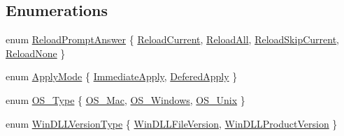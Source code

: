 \subsection*{Enumerations}
\begin{DoxyCompactItemize}
\item 
enum \hyperlink{namespace_utils_a4b02d8e41b34d9ba5605aa6235965efb}{Reload\-Prompt\-Answer} \{ \hyperlink{namespace_utils_a4b02d8e41b34d9ba5605aa6235965efbae44d99051cbed57052984300a3c0a33c}{Reload\-Current}, 
\hyperlink{namespace_utils_a4b02d8e41b34d9ba5605aa6235965efbadae5612b6d3984b62c344e46869a6c27}{Reload\-All}, 
\hyperlink{namespace_utils_a4b02d8e41b34d9ba5605aa6235965efbaa52c359f0451a96e276fa98bef31a7b7}{Reload\-Skip\-Current}, 
\hyperlink{namespace_utils_a4b02d8e41b34d9ba5605aa6235965efba415c3130cb3736c073d02b7e18e4c266}{Reload\-None}
 \}
\item 
enum \hyperlink{namespace_utils_ac2d001247aaff664db3acdb312344458}{Apply\-Mode} \{ \hyperlink{namespace_utils_ac2d001247aaff664db3acdb312344458af3f1f77aef1aabcbd3f037dc744ce210}{Immediate\-Apply}, 
\hyperlink{namespace_utils_ac2d001247aaff664db3acdb312344458a6081d5dba39502dab03be7d2eb297166}{Defered\-Apply}
 \}
\item 
enum \hyperlink{namespace_utils_abe7fc5d4caae893f6d9048a9e5398cd9}{O\-S\-\_\-\-Type} \{ \hyperlink{namespace_utils_abe7fc5d4caae893f6d9048a9e5398cd9acdc4c58a2d65ac2e1921908e1ce7ce18}{O\-S\-\_\-\-Mac}, 
\hyperlink{namespace_utils_abe7fc5d4caae893f6d9048a9e5398cd9a272f059e9ce6c37f8d610b9205a8f36a}{O\-S\-\_\-\-Windows}, 
\hyperlink{namespace_utils_abe7fc5d4caae893f6d9048a9e5398cd9a409fa5aa65dc870bb225847537172a57}{O\-S\-\_\-\-Unix}
 \}
\item 
enum \hyperlink{namespace_utils_a8a09ecaa3bd4054c9ec43e90ec1a355e}{Win\-D\-L\-L\-Version\-Type} \{ \hyperlink{namespace_utils_a8a09ecaa3bd4054c9ec43e90ec1a355eaf8a1858cecec3b9a5a936eedcb5a1e8a}{Win\-D\-L\-L\-File\-Version}, 
\hyperlink{namespace_utils_a8a09ecaa3bd4054c9ec43e90ec1a355ea055926f2ac80f7c474b764ea9268b07f}{Win\-D\-L\-L\-Product\-Version}
 \}
\end{DoxyCompactItemize}
